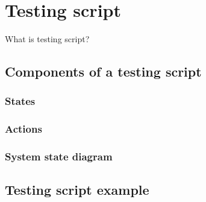\chapter{Testing script}
What is testing script?
\section{Components of a testing script}
  \subsection{States}
  \subsection{Actions}
  \subsection{System state diagram}

\section{Testing script example}
